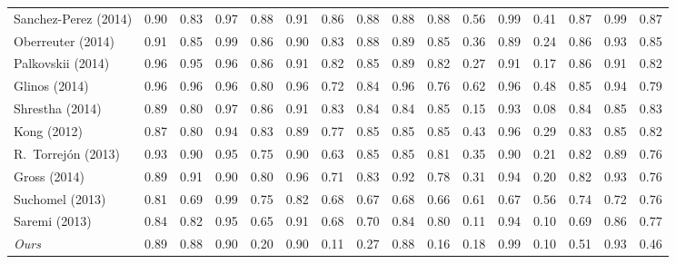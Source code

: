 \begin{table}[th]
\begin{tabularx}{\textwidth}{@{}l*{15}{X}}
Sanchez-Perez (2014)\cite{sanchezperez:2014}        & 0.90  & 0.83  & 0.97  & 0.88  & 0.91  & 0.86  & 0.88  & 0.88  & 0.88  & 0.56  & 0.99  & 0.41  & 0.87  & 0.99  & 0.87  \\
Oberreuter (2014)\cite{oberreuter:2014}             & 0.91  & 0.85  & 0.99  & 0.86  & 0.90  & 0.83  & 0.88  & 0.89  & 0.85  & 0.36  & 0.89  & 0.24  & 0.86  & 0.93  & 0.85  \\
Palkovskii (2014)\cite{palkovskii:2014}             & 0.96  & 0.95  & 0.96  & 0.86  & 0.91  & 0.82  & 0.85  & 0.89  & 0.82  & 0.27  & 0.91  & 0.17  & 0.86  & 0.91  & 0.82  \\
Glinos (2014)\cite{glinos:2014}                     & 0.96  & 0.96  & 0.96  & 0.80  & 0.96  & 0.72  & 0.84  & 0.96  & 0.76  & 0.62  & 0.96  & 0.48  & 0.85  & 0.94  & 0.79  \\
Shrestha (2014)\cite{shrestha:2014}                 & 0.89  & 0.80  & 0.97  & 0.86  & 0.91  & 0.83  & 0.84  & 0.84  & 0.85  & 0.15  & 0.93  & 0.08  & 0.84  & 0.85  & 0.83  \\
Kong (2012)\cite{kong:2012}                         & 0.87  & 0.80  & 0.94  & 0.83  & 0.89  & 0.77  & 0.85  & 0.85  & 0.85  & 0.43  & 0.96  & 0.29  & 0.83  & 0.85  & 0.82  \\
R.\ Torrej{\'o}n (2013)\cite{rodrigueztorrejon:2014}& 0.93  & 0.90  & 0.95  & 0.75  & 0.90  & 0.63  & 0.85  & 0.85  & 0.81  & 0.35  & 0.90  & 0.21  & 0.82  & 0.89  & 0.76  \\
Gross (2014)\cite{gross:2014}                       & 0.89  & 0.91  & 0.90  & 0.80  & 0.96  & 0.71  & 0.83  & 0.92  & 0.78  & 0.31  & 0.94  & 0.20  & 0.82  & 0.93  & 0.76  \\
Suchomel (2013)\cite{suchomel:2014}                 & 0.81  & 0.69  & 0.99  & 0.75  & 0.82  & 0.68  & 0.67  & 0.68  & 0.66  & 0.61  & 0.67  & 0.56  & 0.74  & 0.72  & 0.76  \\
Saremi (2013)\cite{saremi:2013}                     & 0.84  & 0.82  & 0.95  & 0.65  & 0.91  & 0.68  & 0.70  & 0.84  & 0.80  & 0.11  & 0.94  & 0.10  & 0.69  & 0.86  & 0.77  \\

\midrule
\textit{Ours}                                       & 0.89  & 0.88  & 0.90  & 0.20  & 0.90  & 0.11  & 0.27  & 0.88  & 0.16  & 0.18  & 0.99  & 0.10  & 0.51  & 0.93  & 0.46  \\

\bottomrule
\end{tabularx}


\end{table}
